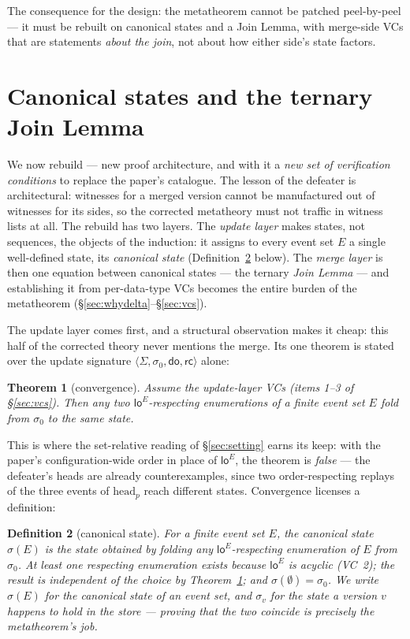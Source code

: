 \documentclass[11pt]{article}
\newtheorem{theorem}{Theorem}[section]
\newtheorem{definition}[theorem]{Definition}
\newcommand{\Sinit}{\sigma_0}
\newcommand{\loE}[1]{\mathsf{lo}^{#1}}
\begin{document}
The consequence for the design: the metatheorem cannot be patched
peel-by-peel --- it must be rebuilt on canonical states and a Join Lemma,
with merge-side VCs that are statements \emph{about the join}, not about
how either side's state factors.

\section{Canonical states and the ternary Join Lemma}
\label{sec:join}

We now rebuild --- new proof architecture, and with it a \emph{new set
of verification conditions} to replace the paper's catalogue. The lesson
of the defeater is architectural: witnesses for a merged version cannot
be manufactured out of witnesses for its sides, so the corrected
metatheory must not traffic in witness lists at all. The rebuild has two
layers. The \emph{update layer} makes states, not sequences, the objects
of the induction: it assigns to every event set $E$ a single
well-defined state, its \emph{canonical state}
(Definition~\ref{def:sigma} below). The \emph{merge layer} is then one
equation between canonical states --- the ternary \emph{Join Lemma} ---
and establishing it from per-data-type VCs becomes the entire burden of
the metatheorem (\S\ref{sec:whydelta}--\S\ref{sec:vcs}).

The update layer comes first, and a structural observation makes it
cheap: this half of the corrected theory never mentions the merge. Its
one theorem is stated over the update signature $\langle \Sigma, \Sinit,
\mathsf{do}, \mathsf{rc}\rangle$ alone:

\begin{theorem}[convergence]
\label{thm:conv}
Assume the update-layer VCs (items 1--3 of \S\ref{sec:vcs}). Then any
two $\loE{E}$-respecting enumerations of a finite event set $E$ fold
from $\Sinit$ to the same state.
\end{theorem}

This is where the set-relative reading of \S\ref{sec:setting} earns
its keep: with the paper's configuration-wide order in place of
$\loE{E}$, the theorem is \emph{false} --- the defeater's heads are
already counterexamples, since two order-respecting replays of the
three events of $\mathrm{head}_p$ reach different states. Convergence
licenses a definition:

\begin{definition}[canonical state]
\label{def:sigma}
For a finite event set $E$, the \emph{canonical state} $\sigma(E)$ is
the state obtained by folding any $\loE{E}$-respecting enumeration of
$E$ from $\Sinit$. At least one respecting enumeration exists because
$\loE{E}$ is acyclic (VC~2); the result is independent of the choice by
Theorem~\ref{thm:conv}; and $\sigma(\emptyset) = \Sinit$. We write
$\sigma(E)$ for the canonical state of an event set, and $\sigma_v$ for
the state a version $v$ happens to hold in the store --- proving that
the two coincide is precisely the metatheorem's job.
\end{definition}
\end{document}
